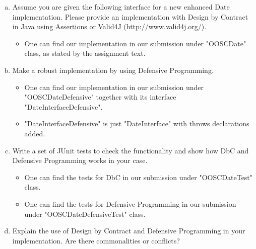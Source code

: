 \documentclass[a4paper,12pt,oneside]{scrreprt}
\newcommand*{\sourcepath}{../code/src/main/java/de/rwth/swc/group10}
\begin{document}
\begin{enumerate}[a)]
	\item Assume you are given the following interface for a new enhanced Date
	implementation. Please provide an implementation with Design by Contract in Java 	using Assertions or Valid4J (http://www.valid4j.org/).\\
	
	
		\begin{itemize}
			\item One can find our implementation in our submission under "OOSCDate" class, as stated by the assignment text.
		\end{itemize}
	
	\item Make a robust implementation by using Defensive Programming.
	
		\begin{itemize}
			\item One can find our implementation in our submission under "OOSCDateDefensive" together with its interface "DateInterfaceDefensive".
			
			\item "DateInterfaceDefensive" is just "DateInterface" with throws declarations added.
		\end{itemize}
	
	\item  Write a set of JUnit tests to check the functionality and show how DbC and Defensive Programming works in your case.
	
		\begin{itemize}
			\item One can find the tests for DbC in our submission under "OOSCDateTest" class.
			
			\item One can find the tests for Defensive Programming in our submission under "OOSCDateDefensiveTest" class.
		\end{itemize}
	
	\item Explain the use of Design by Contract and Defensive Programming in your
	implementation. Are there commonalities or conflicts?
	

\end{enumerate}
\end{document}
